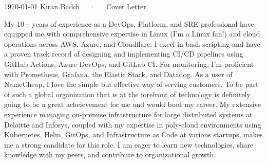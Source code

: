 \documentclass[11pt, a4paper]{awesome-cv}
\begin{document}
\makecvheader[R]

\makecvfooter
  {\today}
  {Kiran Baddi~~~·~~~Cover Letter}
  {}

\makelettertitle

\begin{cvletter}

My 10+ years of experience as a DevOps, Platform, and SRE professional have equipped me with comprehensive expertise in Linux (I'm a Linux fan!) and cloud operations across AWS, Azure, and Cloudflare. I excel in bash scripting and have a proven track record of designing and implementing CI/CD pipelines using GitHub Actions, Azure DevOps, and GitLab CI. For monitoring, I'm proficient with Prometheus, Grafana, the Elastic Stack, and Datadog.
As a user of NameCheap, I love the simple but effective way of serving customers. To be part of such a global organization that is at the forefront of technology is definitely going to be a great acheievement for me and would boot my career.
My extensive experience managing on-premise infrastructure for large distributed systems at Deloitte and Infosys, coupled with my expertise in poly-cloud environments using Kubernetes, Helm, GitOps, and Infrastructure as Code at various startups, makes me a strong candidate for this role. I am eager to learn new technologies, share knowledge with my peers, and contribute to organizational growth.
\end{cvletter}


\makeletterclosing
\end{document}
